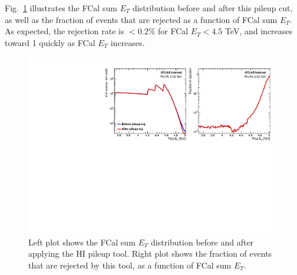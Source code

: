 Fig.~\ref{fig:evtSel_pu_rate} illustrates the FCal sum $E_T$ distribution before and after this pileup cut, as well as the fraction of events that are rejected as a function of FCal sum $E_T$. As expected, the rejection rate is $<0.2\%$ for FCal $E_T<4.5$ TeV, and increases toward 1 quickly as FCal $E_T$ increases.
\begin{figure}[H]
\centering
\includegraphics[width=.9\linewidth]{figs/sec_evtSel/PbPb502/puCut.pdf}
\caption{Left plot shows the FCal sum $E_T$ distribution before and after applying the HI pileup tool. Right plot shows the fraction of events that are rejected by this tool, as a function of FCal sum $E_T$.}
\label{fig:evtSel_pu_rate}
\end{figure}

